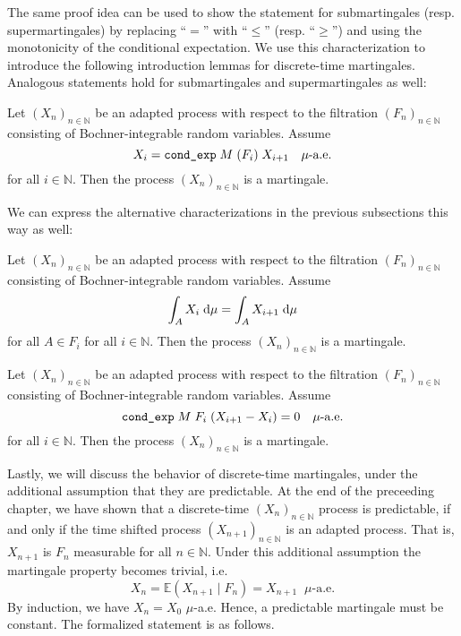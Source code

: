 The same proof idea can be used to show the statement for submartingales (resp. supermartingales) by replacing ``$=$'' with ``$\le$'' (resp. ``$\ge$'') and using the monotonicity of the conditional expectation. We use this characterization to introduce the following introduction lemmas for discrete-time martingales. Analogous statements hold for submartingales and supermartingales as well:

\begin{lemma}
  Let $(X_n)_{n \in \mathbb{N}}$ be an adapted process with respect to the filtration $(F_n)_{n \in \mathbb{N}}$ consisting of Bochner-integrable random variables. Assume 
  \[
  \normalfont X_i = \texttt{cond\_exp} \; M \; (F_i) \; X_{i+1} \quad\mu\textrm{-a.e.} 
  \]
  for all $i \in \mathbb{N}$. Then the process $(X_n)_{n \in \mathbb{N}}$ is a martingale.
\end{lemma}

We can express the alternative characterizations in the previous subsections this way as well:

\begin{lemma}
  Let $(X_n)_{n \in \mathbb{N}}$ be an adapted process with respect to the filtration $(F_n)_{n \in \mathbb{N}}$ consisting of Bochner-integrable random variables. 
  Assume 
  \[
  \normalfont \int_A X_i \;\textrm{d}\mu = \int_A X_{i+1} \;\textrm{d}\mu
  \] 
  for all $A \in F_i$ for all $i \in \mathbb{N}$. Then the process $(X_n)_{n \in \mathbb{N}}$ is a martingale.
\end{lemma}

\begin{lemma}
  Let $(X_n)_{n \in \mathbb{N}}$ be an adapted process with respect to the filtration $(F_n)_{n \in \mathbb{N}}$ consisting of Bochner-integrable random variables. Assume 
  \[
  \normalfont \texttt{cond\_exp} \; M \; F_i \; (X_{i+1} - X_i) = 0 \quad\mu\textrm{-a.e.}
  \] 
  for all $i \in \mathbb{N}$. Then the process $(X_n)_{n \in \mathbb{N}}$ is a martingale.
\end{lemma}

Lastly, we will discuss the behavior of discrete-time martingales, under the additional assumption that they are predictable. At the end of the preceeding chapter, we have shown that a discrete-time $(X_n)_{n \in \mathbb{N}}$ process is predictable, if and only if the time shifted process $(X_{n + 1})_{n \in \mathbb{N}}$ is an adapted process. That is, $X_{n+1}$ is $F_n$ measurable for all $n \in \mathbb{N}$. Under this additional assumption the martingale property becomes trivial, i.e.
\[
	X_n = \mathbb{E}(X_{n+1} \;\vert\; F_n) = X_{n+1} \;\;\mu\textrm{-a.e.}
\]
By induction, we have $X_n = X_0$ $\mu$-a.e. Hence, a predictable martingale must be constant. The formalized statement is as follows.

